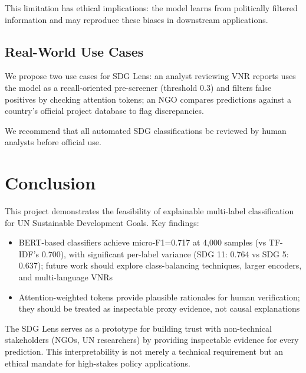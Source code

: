 \documentclass[12pt,a4paper]{article}
\begin{document}
This limitation has ethical implications: the model learns from politically filtered information and may reproduce these biases in downstream applications.

\subsection{Real-World Use Cases}

We propose two use cases for SDG Lens: an analyst reviewing VNR reports uses the model as a recall-oriented pre-screener (threshold 0.3) and filters false positives by checking attention tokens; an NGO compares predictions against a country's official project database to flag discrepancies.

We recommend that all automated SDG classifications be reviewed by human analysts before official use.

\section{Conclusion}

This project demonstrates the feasibility of explainable multi-label classification for UN Sustainable Development Goals. Key findings:

\begin{itemize}
\item BERT-based classifiers achieve micro-F1=0.717 at 4,000 samples (vs TF-IDF's 0.700), with significant per-label variance (SDG 11: 0.764 vs SDG 5: 0.637); future work should explore class-balancing techniques, larger encoders, and multi-language VNRs
\item Attention-weighted tokens provide plausible rationales for human verification; they should be treated as inspectable proxy evidence, not causal explanations
\end{itemize}

The SDG Lens serves as a prototype for building trust with non-technical stakeholders (NGOs, UN researchers) by providing inspectable evidence for every prediction. This interpretability is not merely a technical requirement but an ethical mandate for high-stakes policy applications.
\end{document}
